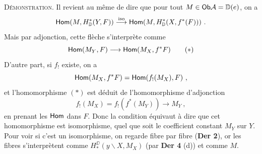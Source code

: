 \noindent\textsc{Démonstration}. Il revient au même de dire que pour tout $M \in \mathsf{Ob} \mathcal{A} = \mathbb{D}(e)$, on a
\[
\mathsf{Hom}(M, H^*_{\mathbb{D}}(Y, F)) \overset{\mathrm{iso}}{\longrightarrow} \mathsf{Hom}(M, H^*_{\mathbb{D}}(X, f^*(F))) \ .
\]
Mais par adjonction, cette flèche s'interprète comme
\[
\mathsf{Hom}(M_Y, F) \longrightarrow \mathsf{Hom}(M_X, f^*F) \tag*{$(*)$}
\]
D'autre part, si $f_!$ existe, on a
\[
\mathsf{Hom}(M_X, f^*F) = \mathsf{Hom}(f_!(M_X), F) \ ,
\]
et l'homomorphisme $(*)$ est déduit de l'homomorphisme d'adjonction
\[
f_!(M_X) = f_!(f^*(M_Y)) \longrightarrow M_Y \ , \tag*{$(**)$}
\]
en prenant les $\mathsf{Hom}$ dans $F$. Donc la condition équivaut à dire que cet homomorphisme est isomorphisme, quel que soit le coefficient constant $M_Y$ sur $Y$. Pour voir si c'est un isomorphisme, on regarde fibre par fibre (\textbf{Der 2}), or les fibres s'interprètent comme $H^{\DD}_*(y\backslash X, M_X)$ (par \textbf{Der 4} (d)) et comme $M$.


